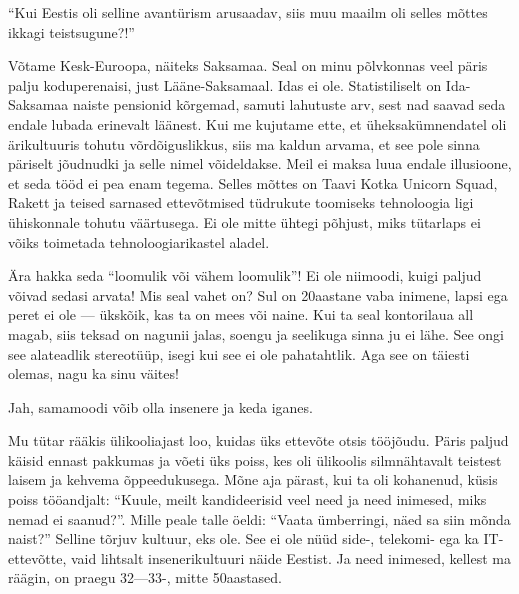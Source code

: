 \enquote{Kui Eestis oli selline avantürism arusaadav, siis muu maailm oli selles mõttes ikkagi teistsugune?!}

Võtame Kesk-Euroopa, näiteks Saksamaa. Seal on
minu põlvkonnas veel päris palju koduperenaisi, just Lääne-Saksamaal. 
Idas ei ole. Statistiliselt on Ida-Saksamaa naiste 
pensionid kõrgemad, samuti lahutuste arv, sest nad saavad 
seda endale lubada erinevalt läänest. Kui me kujutame ette, et 
üheksakümnendatel oli ärikultuuris tohutu võrdõiguslikkus, siis ma kaldun arvama, 
et see pole sinna päriselt jõudnudki ja selle nimel võideldakse. Meil ei maksa luua endale illusioone, 
et seda tööd ei pea enam tegema. Selles mõttes on Taavi Kotka Unicorn Squad, Rakett ja teised sarnased ettevõtmised tüdrukute 
toomiseks tehnoloogia ligi ühiskonnale tohutu väärtusega. Ei 
ole mitte ühtegi põhjust, miks tütarlaps ei võiks toimetada tehnoloogiarikastel 
aladel.


Ära hakka seda \enquote{loomulik või vähem loomulik}! Ei ole niimoodi, kuigi paljud võivad sedasi arvata! Mis seal vahet on? Sul 
on 20aastane vaba inimene, lapsi ega peret ei ole --- ükskõik, kas ta on mees või naine. Kui 
ta seal kontorilaua all magab, siis teksad on nagunii jalas, soengu ja 
seelikuga sinna ju ei lähe. See ongi see alateadlik stereotüüp, isegi kui see ei ole pahatahtlik. Aga see on täiesti olemas, nagu ka sinu 
väites!


Jah, samamoodi võib olla insenere ja keda iganes.


Mu tütar rääkis ülikooliajast loo, kuidas üks ettevõte otsis tööjõudu. 
Päris paljud käisid ennast pakkumas ja võeti üks poiss, kes oli ülikoolis 
silmnähtavalt teistest laisem ja kehvema õppeedukusega. Mõne aja pärast, kui ta oli kohanenud, küsis poiss
tööandjalt: \enquote{Kuule, meilt kandideerisid veel need ja 
need inimesed, miks nemad ei saanud?}. Mille peale talle öeldi: 
\enquote{Vaata ümberringi, näed sa siin mõnda naist?} Selline tõrjuv kultuur, 
eks ole. See ei ole nüüd side-, telekomi- ega ka IT-ettevõtte, vaid lihtsalt insenerikultuuri näide Eestist. Ja need inimesed, 
kellest ma räägin, on praegu 32---33-, mitte 50aastased.

